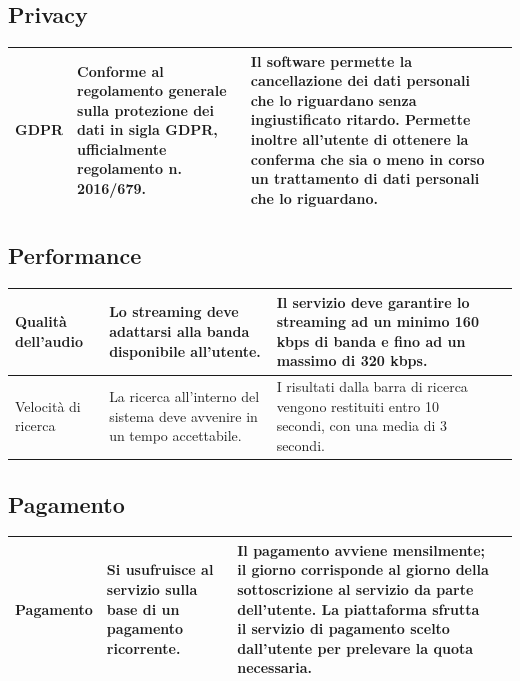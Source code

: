 \documentclass[a4paper,12pt]{article}
\begin{document}
\subsection*{Privacy}

{
    \centering
    \begin{tabularx}{\textwidth}{|l|>{\raggedright\arraybackslash}X|>{\raggedright\arraybackslash}X|>{\raggedright\arraybackslash}X|}
    \hline
    GDPR & Conforme al regolamento generale sulla protezione dei dati in sigla GDPR, ufficialmente regolamento n. 2016/679. & Il software permette la cancellazione dei dati personali che lo riguardano senza ingiustificato ritardo. Permette inoltre all’utente di ottenere la conferma che sia o meno in corso un trattamento di dati personali che lo riguardano. \\
    \hline
    \end{tabularx} \par
}
\subsection*{Performance}

{
    \centering
    \begin{tabularx}{\textwidth}{|l|>{\raggedright\arraybackslash}X|>{\raggedright\arraybackslash}X|>{\raggedright\arraybackslash}X|}
    \hline
    Qualità dell'audio & Lo streaming deve adattarsi alla banda disponibile all’utente. & Il servizio deve garantire lo streaming ad un minimo 160 kbps di banda e fino ad un massimo di 320 kbps. \\ \hline
    Velocità di ricerca & La ricerca all’interno del sistema deve avvenire in un tempo accettabile. & I risultati dalla barra di ricerca vengono restituiti entro 10 secondi, con una media di 3 secondi. \\
    \hline
    \end{tabularx} \par
}
\subsection*{Pagamento}

{
    \centering
    \begin{tabularx}{\textwidth}{|l|>{\raggedright\arraybackslash}X|>{\raggedright\arraybackslash}X|>{\raggedright\arraybackslash}X|}
    \hline
    Pagamento & Si usufruisce al servizio sulla base di un pagamento ricorrente. & Il pagamento avviene mensilmente; il giorno corrisponde al giorno della sottoscrizione al servizio da parte dell’utente. La piattaforma sfrutta il servizio di pagamento scelto dall’utente per prelevare la quota necessaria. \\
    \hline
    \end{tabularx} \par
}
\end{document}
